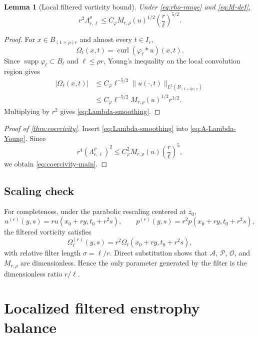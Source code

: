 \documentclass[11pt]{article}
\numberwithin{equation}{section}
\theoremstyle{plain}
\newtheorem{lemma}[theorem]{Lemma}
\theoremstyle{definition}
\theoremstyle{remark}
\DeclareMathOperator{\curl}{curl}
\DeclareMathOperator{\supp}{supp}
\begin{document}
\begin{lemma}[Local filtered vorticity bound]\label{lem:filter-smoothing}
Under \eqref{eq:rho-range} and \eqref{eq:M-def},
\begin{equation}\label{eq:Lambda-smoothing}
r^2\Lambda_{r,\ell}^{\rho}
\le
C_\varphi M_{r,\rho}(u)^{1/2}
\left(\frac r\ell\right)^{5/2}.
\end{equation}
\end{lemma}

\begin{proof}
For $x\in B_{(1+\rho)r}$ and almost every $t\in I_r$,
\[
\Omega_\ell(x,t)=\curl(\varphi_\ell*u)(x,t).
\]
Since $\supp\varphi_\ell\subset B_\ell$ and $\ell\le\rho r$, Young's inequality on the local convolution region gives
\begin{align*}
|\Omega_\ell(x,t)|
&\le
C_\varphi\ell^{-5/2}
\|u(\cdot,t)\|_{L^2(B_{(1+2\rho)r})}\\
&\le
C_\varphi\ell^{-5/2}
M_{r,\rho}(u)^{1/2}r^{1/2}.
\end{align*}
Multiplying by $r^2$ gives \eqref{eq:Lambda-smoothing}.
\end{proof}

\begin{proof}[Proof of \cref{thm:coercivity}]
Insert \eqref{eq:Lambda-smoothing} into \eqref{eq:A-Lambda-Young}. Since
\[
r^4(\Lambda_{r,\ell}^{\rho})^2
\le
C_\varphi^2M_{r,\rho}(u)
\left(\frac r\ell\right)^5,
\]
we obtain \eqref{eq:coercivity-main}.
\end{proof}

\subsection{Scaling check}

For completeness, under the parabolic rescaling centered at $z_0$,
\[
u^{(r)}(y,s)=r u(x_0+ry,t_0+r^2s),
\qquad
p^{(r)}(y,s)=r^2p(x_0+ry,t_0+r^2s),
\]
the filtered vorticity satisfies
\[
\Omega_{\ell}^{(r)}(y,s)
=r^2\Omega_\ell(x_0+ry,t_0+r^2s),
\]
with relative filter length $\sigma=\ell/r$. Direct substitution shows that $\mathcal A$, $\mathcal P$, $\mathcal O$, and $M_{r,\rho}$ are dimensionless. Hence the only parameter generated by the filter is the dimensionless ratio $r/\ell$.

\section{Localized filtered enstrophy balance}\label{sec:balance}
\end{document}
